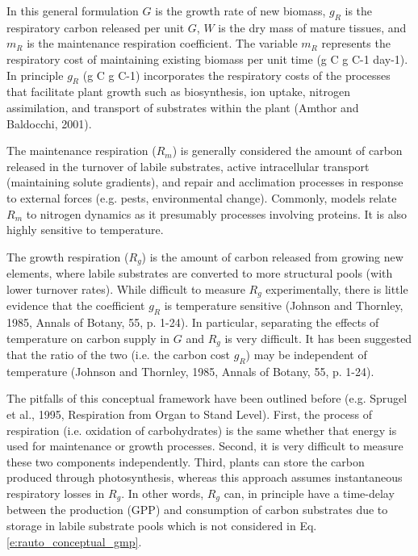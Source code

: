 \documentclass[twoside,10pt]{report}
\begin{document}
In this general formulation $G$ is the growth rate of new biomass, $g_R$ is the respiratory carbon released per unit $G$, $W$ is the dry mass of mature tissues, and $m_R$ is the maintenance respiration coefficient. The variable $m_R$ represents the respiratory cost of maintaining existing biomass per unit time (g C g C-1 day-1). In principle $g_R$ (g C g C-1) incorporates the respiratory costs of the processes that facilitate plant growth such as biosynthesis, ion uptake, nitrogen assimilation, and transport of substrates within the plant (Amthor and Baldocchi, 2001). 

The maintenance respiration ($R_m$) is generally considered the amount of carbon released in the turnover of labile substrates, active intracellular transport (maintaining solute gradients), and repair and acclimation processes in response to external forces (e.g. pests, environmental change). Commonly, models relate $R_m$ to nitrogen dynamics as it presumably processes involving proteins. It is also highly sensitive to temperature. 

The growth respiration ($R_g$) is the amount of carbon released from growing new elements, where labile substrates are converted to more structural pools (with lower turnover rates). While difficult to measure $R_g$ experimentally, there is little evidence that the coefficient $g_R$ is temperature sensitive (Johnson and Thornley, 1985, Annals of Botany, 55, p. 1-24). In particular, separating the effects of temperature on carbon supply in $G$ and $R_g$ is very difficult. It has been suggested that the ratio of the two (i.e. the carbon cost $g_R$) may be independent of temperature (Johnson and Thornley, 1985, Annals of Botany, 55, p. 1-24).

The pitfalls of this conceptual framework have been outlined before (e.g. Sprugel et al., 1995, Respiration from Organ to Stand Level). First, the process of respiration (i.e. oxidation of carbohydrates) is the same whether that energy is used for maintenance or growth processes. Second, it is very difficult to measure these two components independently. Third, plants can store the carbon produced through photosynthesis, whereas this approach assumes instantaneous respiratory losses in $R_g$. In other words, $R_g$ can, in principle have a time-delay between the production (GPP) and consumption of carbon substrates due to storage in labile substrate pools which is not considered in Eq. \ref{e:rauto_conceptual_gmp}. 
\end{document}
